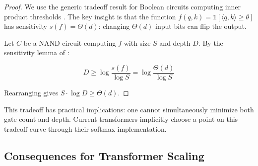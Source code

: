 \documentclass[11pt]{article}
\theoremstyle{definition}
\begin{document}
\begin{proof}






We use the generic tradeoff result for Boolean circuits computing inner product thresholds \cite{paterson1977deterministic}. The key insight is that the function $f(q,k) = \mathbb{1}[\langle q, k \rangle \geq \theta]$ has sensitivity $s(f) = \Theta(d)$: changing $\Theta(d)$ input bits can flip the output.













Let $C$ be a NAND circuit computing $f$ with size $S$ and depth $D$. By the sensitivity lemma of \cite{boppana1997complexity}:






\[






D \geq \log \frac{s(f)}{\log S} = \log \frac{\Theta(d)}{\log S}






\]






Rearranging gives $S \cdot \log D \geq \Theta(d)$.






\end{proof}













This tradeoff has practical implications: one cannot simultaneously minimize both gate count and depth. Current transformers implicitly choose a point on this tradeoff curve through their softmax implementation.













\subsection{Consequences for Transformer Scaling}
\end{document}
